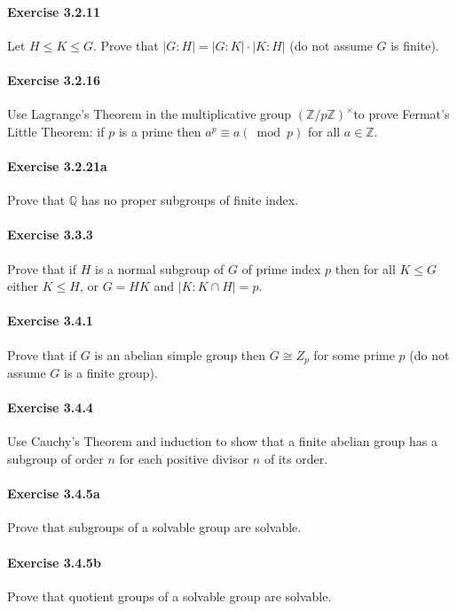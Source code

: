 \documentclass{article}
\begin{document}
\paragraph{Exercise 3.2.11} Let $H \leq K \leq G$. Prove that $|G: H|=|G: K| \cdot|K: H|$ (do not assume $G$ is finite).

\paragraph{Exercise 3.2.16} Use Lagrange's Theorem in the multiplicative group $(\mathbb{Z} / p \mathbb{Z})^{\times}$to prove Fermat's Little Theorem: if $p$ is a prime then $a^{p} \equiv a(\bmod p)$ for all $a \in \mathbb{Z}$.

\paragraph{Exercise 3.2.21a} Prove that $\mathbb{Q}$ has no proper subgroups of finite index.

\paragraph{Exercise 3.3.3} Prove that if $H$ is a normal subgroup of $G$ of prime index $p$ then for all $K \leq G$ either $K \leq H$, or $G=H K$ and $|K: K \cap H|=p$.

\paragraph{Exercise 3.4.1} Prove that if $G$ is an abelian simple group then $G \cong Z_{p}$ for some prime $p$ (do not assume $G$ is a finite group).

\paragraph{Exercise 3.4.4} Use Cauchy's Theorem and induction to show that a finite abelian group has a subgroup of order $n$ for each positive divisor $n$ of its order.

\paragraph{Exercise 3.4.5a} Prove that subgroups of a solvable group are solvable.

\paragraph{Exercise 3.4.5b} Prove that quotient groups of a solvable group are solvable.
\end{document}
